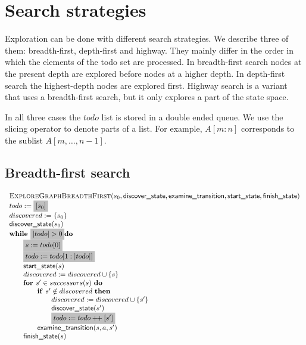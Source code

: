 \documentclass{article}
\newcommand{\concat}{\ensuremath{+\!\!+\:}}
\newcommand{\Space}{\text{\ }}
\newcommand{\If}{\text{\textbf{if }}}
\newcommand{\Do}{\text{\textbf{do }}}
\newcommand{\Then}{\text{\textbf{then }}}
\newcommand{\For}{\text{\textbf{for }}}
\newcommand{\While}{\text{\textbf{while }}}
\begin{document}
\newpage
\section{Search strategies}

Exploration can be done with different search strategies. We describe three of them: breadth-first, depth-first and highway. They mainly differ in the order in which the elements of the todo set are processed. In breadth-first search nodes at the present depth are explored before nodes at a higher depth. In depth-first search the highest-depth nodes are explored first. Highway search is a variant that uses a breadth-first search, but it only explores a part of the state space.

In all three cases the $todo$ list is stored in a double ended queue. We use the slicing operator to denote parts of a list. For example, $A[m:n]$ corresponds to the sublist $A[m,\ldots,n-1]$.

\subsection{Breadth-first search}
\[
\begin{tabular}{l}
\textsc{ExploreGraphBreadthFirst}($s_0, \textsf{discover\_state}, \textsf{examine\_transition},
\textsf{start\_state}, \textsf{finish\_state}$) \\
$todo := \colorbox{lightgray}{$[s_0]$}$ \\
$discovered := \{ s_0 \}$ \\
$\textsf{discover\_state}(s_0)$ \\
$\While \colorbox{lightgray}{$|todo| > 0$} \Do$ \\
\qquad \colorbox{lightgray}{$s := todo[0]$} \\
\qquad \colorbox{lightgray}{$todo := todo[1:|todo|]$} \\
\qquad $\textsf{start\_state}(s)$ \\
\qquad $discovered := discovered \cup \{s\}$ \\
\qquad $\For s' \in successors(s)  \Space \Do$ \\
\qquad \qquad $\If s' \notin discovered \Space \Then$ \\
\qquad \qquad \qquad $discovered := discovered \cup \{s' \}$ \\
\qquad \qquad \qquad $\textsf{discover\_state}(s')$ \\
\qquad \qquad \qquad \colorbox{lightgray}{$todo := todo \concat [s']$} \\
\qquad \qquad $\textsf{examine\_transition}(s, a, s')$ \\
\qquad $\textsf{finish\_state}(s)$ \\
\end{tabular}
\]
\end{document}
